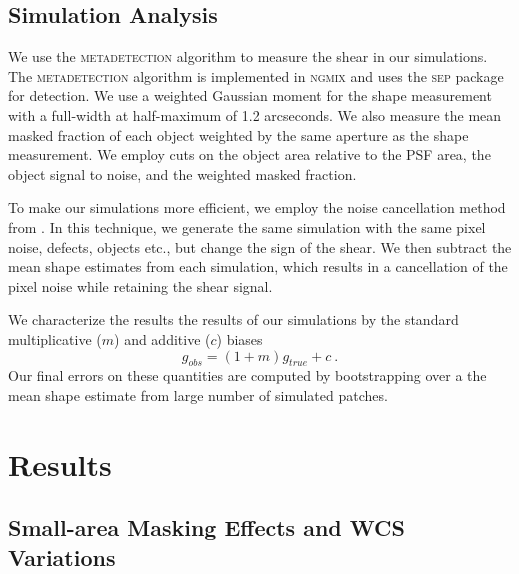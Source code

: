 \documentclass[twocolappendix, appendixfloats, numberedappendix, twocolumn, apj]{openjournal}
\newcommand{\mdet}{\textsc{metadetection}\xspace}
\newcommand{\ngmix}{\textsc{ngmix}\xspace}
\newcommand{\sep}{\textsc{sep}\xspace}
\begin{document}
\subsection{Simulation Analysis}

We use the \mdet algorithm to measure the shear in our simulations. The \mdet algorithm is implemented in
\ngmix and uses the \sep package \citep{sep} for detection. We use a weighted Gaussian moment for the shape
measurement with a full-width at half-maximum of 1.2 arcseconds. We also measure the mean masked fraction
of each object weighted by the same aperture as the shape measurement. We employ cuts on the object area relative to
the PSF area, the object signal to noise, and the weighted masked fraction.

To make our simulations more efficient, we employ the noise cancellation method from \citet{pujol2019}. In this technique,
we generate the same simulation with the same pixel noise, defects, objects etc., but change the sign of
the shear. We then subtract the mean shape estimates from each simulation, which results in a cancellation of
the pixel noise while retaining the shear signal.

We characterize the results the results of our simulations by the standard multiplicative ($m$) and additive ($c$) biases
\begin{equation}
g_{obs} = (1+m)g_{true} + c\ .
\end{equation}
Our final errors on these quantities are computed by bootstrapping over a the mean shape estimate from large
number of simulated patches.

\section{Results}\label{sec:results}

\subsection{Small-area Masking Effects and WCS Variations}
\end{document}
